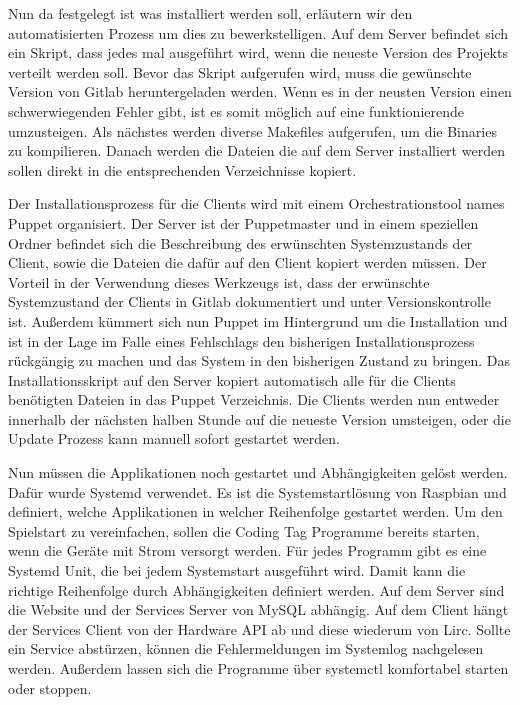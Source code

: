 Nun da festgelegt ist was installiert werden soll, erläutern wir den
automatisierten Prozess um dies zu bewerkstelligen. Auf dem Server befindet
sich ein Skript, dass jedes mal ausgeführt wird, wenn die neueste Version des
Projekts verteilt werden soll. Bevor das Skript aufgerufen wird, muss die
gewünschte Version von Gitlab heruntergeladen werden. Wenn es in der neusten
Version einen schwerwiegenden Fehler gibt, ist es somit möglich auf eine
funktionierende umzusteigen. Als nächstes werden diverse Makefiles aufgerufen,
um die Binaries zu kompilieren. Danach werden die Dateien die auf dem Server
installiert werden sollen direkt in die entsprechenden Verzeichnisse kopiert.

Der Installationsprozess für die Clients wird mit einem Orchestrationstool
names Puppet organisiert. Der Server ist der Puppetmaster und in einem
speziellen Ordner befindet sich die Beschreibung des erwünschten Systemzustands
der Client, sowie die Dateien die dafür auf den Client kopiert werden müssen.
Der Vorteil in der Verwendung dieses Werkzeugs ist, dass der erwünschte
Systemzustand der Clients in Gitlab dokumentiert und unter Versionskontrolle
ist. Außerdem kümmert sich nun Puppet im Hintergrund um die Installation und
ist in der Lage im Falle eines Fehlschlags den bisherigen Installationsprozess
rückgängig zu machen und das System in den bisherigen Zustand zu bringen. Das
Installationsskript auf den Server kopiert automatisch alle für die Clients
benötigten Dateien in das Puppet Verzeichnis. Die Clients werden nun entweder
innerhalb der nächsten halben Stunde auf die neueste Version umsteigen, oder
die Update Prozess kann manuell sofort gestartet werden.

Nun müssen die Applikationen noch gestartet und Abhängigkeiten gelöst werden.
Dafür wurde Systemd verwendet. Es ist die Systemstartlösung von Raspbian und
definiert, welche Applikationen in welcher Reihenfolge gestartet werden. Um
den Spielstart zu vereinfachen, sollen die Coding Tag Programme bereits starten,
wenn die Geräte mit Strom versorgt werden. Für jedes Programm gibt es eine
Systemd Unit, die bei jedem Systemstart ausgeführt wird. Damit kann die
richtige Reihenfolge durch Abhängigkeiten definiert werden. Auf dem Server
sind die Website und der Services Server von MySQL abhängig. Auf dem Client
hängt der Services Client von der Hardware API ab und diese wiederum von Lirc.
Sollte ein Service abstürzen, können die Fehlermeldungen im Systemlog
nachgelesen werden. Außerdem lassen sich die Programme über systemctl
komfortabel starten oder stoppen.

